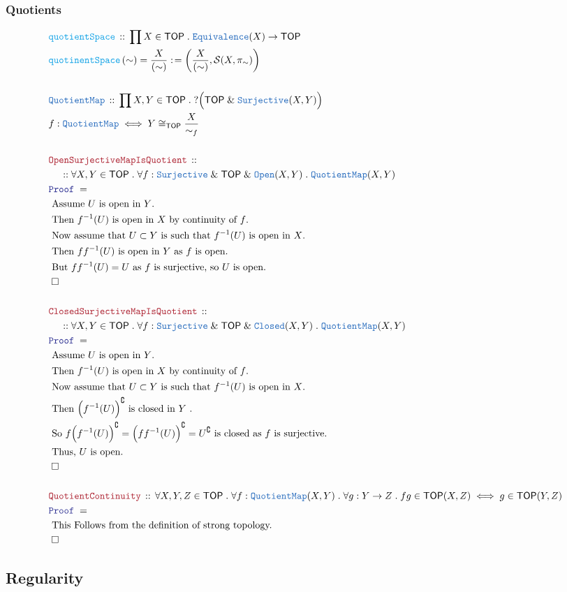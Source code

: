 \documentclass[12pt]{scrartcl}
\newcommand{\TYPE}[1]{\textcolor{NavyBlue}{\mathtt{#1}}}
\newcommand{\FUNC}[1]{\textcolor{Cerulean}{\mathtt{#1}}}
\newcommand{\LOGIC}[1]{\textcolor{Blue}{\mathtt{#1}}}
\newcommand{\THM}[1]{\textcolor{Maroon}{\mathtt{#1}}}
\renewcommand{\.}{\; . \;}
\newcommand{\de}{: \kern 0.1pc =}
\newcommand{\Act}[1]{\left( #1 \right)}
\newcommand{\Theorem}[2]{& \THM{#1} \, :: \, #2 \\ & \Proof = \\ }
\newcommand{\DeclareType}[2]{& \TYPE{#1} \, :: \, #2 \\}
\newcommand{\DefineType}[3]{& #1 : \TYPE{#2} \iff #3 \\}
\newcommand{\DeclareFunc}[2]{& \FUNC{#1} \, :: \, #2 \\}
\newcommand{\DefineNamedFunc}[4]{&  \FUNC{#1}\Act{#2} = #3 \de #4 \\}
\newcommand{\NewLine}{\\ & \kern 1pc}
\newcommand{\Page}[1]{ \begin{align*} #1 \end{align*}   }
\newcommand{\Explain}[1]{& \text{#1.} \\}
\renewcommand{\And}{\; \& \;}
\newcommand{\Surj}{\TYPE{Surjective}}
\renewcommand{\c}{\complement}
\newcommand{\QED}{\; \square}
\newcommand{\EndProof}{& \QED \\}
\newcommand{\Proof}{\LOGIC{Proof} \; }
\newcommand{\Closed}{\TYPE{Closed}}
\newcommand{\Open}{\TYPE{Open}}
\newcommand{\QM}{\TYPE{QuotientMap}}
\newcommand{\TOP}{\mathsf{TOP}}
\renewcommand{\S}{\mathcal{S}}
\begin{document}
\subsubsection{Quotients}
\Page{
	\DeclareFunc{quotientSpace}{\prod X \in \TOP \. \TYPE{Equivalence}(X) \to \TOP}
	\DefineNamedFunc{quotinentSpace}{\sim}{\frac{X}{(\sim)}}{
		\Act{\frac{X}{(\sim)}, \S(X,\pi_\sim)}
	}
	\\
	\DeclareType{QuotientMap}{ 
		\prod X,Y \in \TOP \.    ?\Big(\TOP \And \Surj(X,Y)\Big)
	}
	\DefineType{f}{QuotientMap}{Y \cong_\TOP \frac{X}{\sim_f}}
	\\
	\Theorem{OpenSurjectiveMapIsQuotient}
	{
		\NewLine :: 
		\forall X,Y \in \TOP \.
		\forall f : \Surj \And \TOP \And \Open(X,Y) \.
		\QM(X,Y)	
	}
	\Explain{
		Assume $U$ is open in $Y$}
	\Explain{
		Then $f^{-1}(U)$ is open in $X$ by continuity of $f$}
	\Explain{
		Now assume that $U \subset Y$ is such that $f^{-1}(U)$ is open in $X$}
	\Explain{
		Then $ff^{-1}(U)$ is open in $Y$ as $f$ is open}
	\Explain{
		But $ff^{-1}(U)  = U$ as $f$ is surjective,
		so $U$ is open}
	\EndProof
	\\
	\Theorem{ClosedSurjectiveMapIsQuotient}
	{
		\NewLine :: 
		\forall X,Y \in \TOP \.
		\forall f : \Surj \And \TOP \And \Closed(X,Y) \.
		\QM(X,Y)	
	}
	\Explain{
		Assume $U$ is open in $Y$}
	\Explain{
		Then $f^{-1}(U)$ is open in $X$ by continuity of $f$}
	\Explain{
		Now assume that $U \subset Y$ is such that $f^{-1}(U)$ is open in $X$}
	\Explain{
		Then $\Big(f^{-1}(U)\Big)^\c$ is closed in $Y$ }
	\Explain{
		So  $f\Big( f^{-1}(U) \Big)^\c = \Big( ff^{-1}(U)\Big)^\c = U^\c$ is closed
		as $f$ is surjective}
	\Explain{
		Thus, $U$ is open}
	\EndProof
	\\
	\Theorem{QuotientContinuity}
	{
		\forall X,Y,Z \in \TOP \.
		\forall f : \QM(X,Y) \.
		\forall g : Y \to Z \.
		fg \in \TOP(X,Z) \iff g \in \TOP(Y,Z)
	}
	\Explain{ This Follows from the definition of strong topology}
	\EndProof
}
\newpage
\subsection{Regularity}
\end{document}

